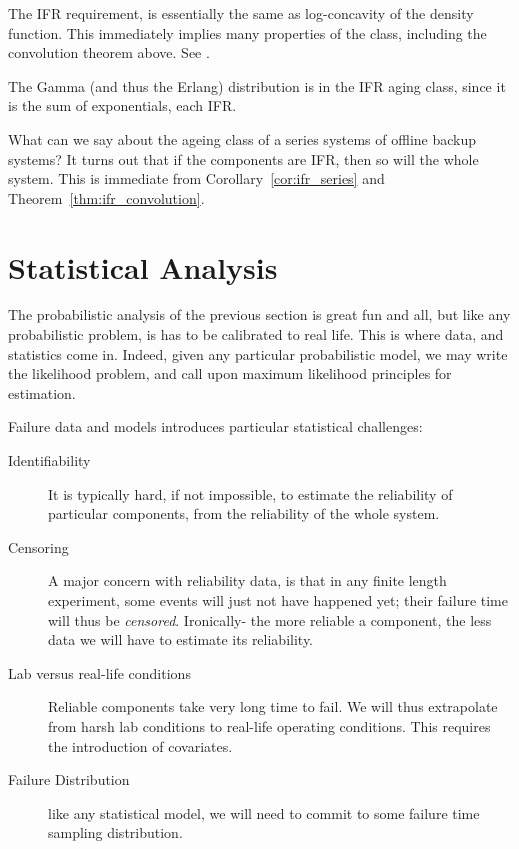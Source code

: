 \begin{extra}
The IFR requirement, is essentially the same as log-concavity of the density function.
This immediately implies many properties of the class, including the convolution theorem above.
See \cite{bagnoli_log-concave_2005}.
\end{extra}

\begin{example}
The Gamma (and thus the Erlang) distribution is in the IFR aging class, since it is the sum of exponentials, each IFR.
\end{example}

\begin{example}
What can we say about the ageing class of a series systems of offline backup systems? 
It turns out that if the components are IFR, then so will the whole system.
This is immediate from Corollary~\ref{cor:ifr_series} and Theorem~\ref{thm:ifr_convolution}.
\end{example}






\section{Statistical Analysis}
The probabilistic analysis of the previous section is great fun and all, but like any probabilistic problem, is has to be calibrated to real life. 
This is where data, and statistics come in.
Indeed, given any particular probabilistic model, we may write the likelihood problem, and call upon maximum likelihood principles for estimation.

Failure data and models introduces particular statistical challenges:
\begin{description}
\item [Identifiability] It is typically hard, if not impossible, to estimate the reliability of particular components, from the reliability of the whole system. 
\item [Censoring] A major concern with reliability data, is that in any finite length experiment, some events will just not have happened yet; their failure time will thus be \emph{censored}. Ironically- the more reliable a component, the less data we will have to estimate its reliability. 
\item [Lab versus real-life conditions] Reliable components take very long time to fail. We will thus extrapolate from harsh lab conditions to real-life operating conditions. This requires the introduction of covariates. 
\item [Failure Distribution] like any statistical model, we will need to commit to some failure time sampling distribution.
\end{description}


